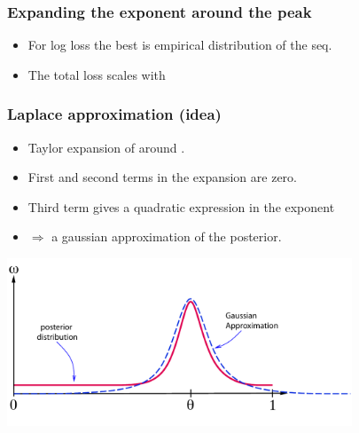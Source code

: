 \documentclass[handout]{beamer}
\begin{document}
\begin{frame}
\frametitle{Expanding the exponent around the peak}

\begin{itemize}
\item
For log loss the best \R{$\theta$} is empirical distribution
of the seq.
\R{\[
	\btheta = {\#\{x^t=1;\;\; 1 \leq t \leq T \} \over T} 
\]}
\item
The total loss scales with 
\R{\[
\TEloss{\theta} =
 T \cdot (\btheta \ell(\theta,1) + (1-\btheta)\ell(\theta,0))
 \doteq T \cdot g(\btheta,\theta)
\]}
\end{itemize}
\pause
{}
\end{frame}

\begin{frame}
\frametitle{Laplace approximation (idea)}
\begin{itemize}
\item Taylor expansion of  around \R{$\theta=\btheta$}.
\item
First and second terms in the expansion are zero.
\item
Third term gives a quadratic expression in the exponent
\item
$\Rightarrow$ a gaussian approximation of the posterior.
\end{itemize}
\pause
\includegraphics[height=5cm]{figures/Laplace.pdf}

\end{frame}
\end{document}
